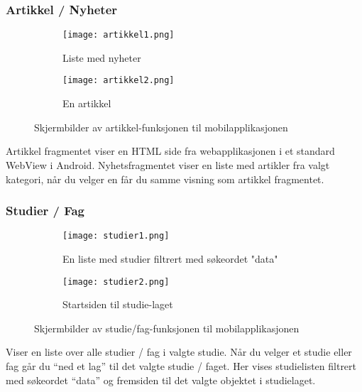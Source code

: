 \documentclass[../main.tex]{subfiles}
\begin{document}
\subsubsection{Artikkel / Nyheter}

\begin{figure}[H]
        \centering
        \begin{subfigure}[b]{0.3\textwidth}
                \centering
                \texttt{[image: artikkel1.png]}
                \caption{Liste med nyheter}
        \end{subfigure}
        \quad
        \begin{subfigure}[b]{0.3\textwidth}
                \centering
                \texttt{[image: artikkel2.png]}
                \caption{En artikkel}
        \end{subfigure}
        \caption{Skjermbilder av artikkel-funksjonen til mobilapplikasjonen}
\end{figure}

Artikkel fragmentet viser en HTML side fra webapplikasjonen i et standard WebView i Android. Nyhetsfragmentet viser en liste med artikler fra valgt kategori, når du velger en får du samme visning som artikkel fragmentet.

\subsubsection{Studier / Fag}

\begin{figure}[H]
        \centering
        \begin{subfigure}[b]{0.3\textwidth}
                \centering
                \texttt{[image: studier1.png]}
                \caption{En liste med studier filtrert med søkeordet "data"}
        \end{subfigure}
        \quad
        \begin{subfigure}[b]{0.3\textwidth}
                \centering
                \texttt{[image: studier2.png]}
                \caption{Startsiden til studie-laget}
        \end{subfigure}
        \caption{Skjermbilder av studie/fag-funksjonen til mobilapplikasjonen}
\end{figure}

Viser en liste over alle studier / fag i valgte studie. Når du velger et studie eller fag går du “ned et lag” til det valgte studie / faget. Her vises studielisten filtrert med søkeordet “data” og fremsiden til det valgte objektet i studielaget.
\end{document}
